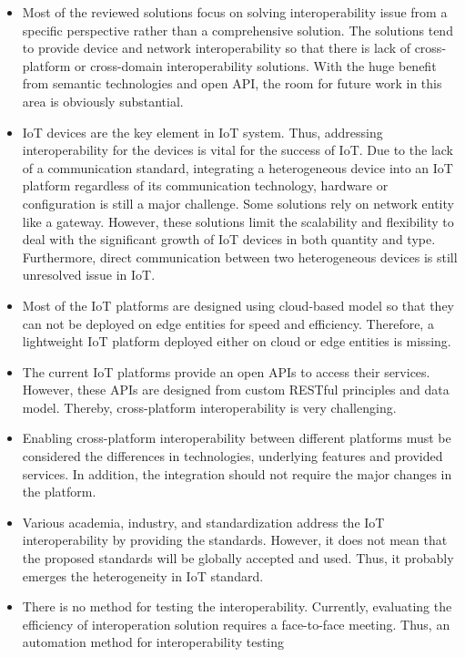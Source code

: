 \begin{itemize}

    \item Most of the reviewed solutions focus on solving interoperability issue from a specific perspective rather than a comprehensive solution. The solutions tend to provide device and network interoperability so that there is lack of cross-platform or cross-domain interoperability solutions. With the huge benefit from semantic technologies and open API, the room for future work in this area is obviously substantial.
    
    \item IoT devices are the key element in IoT system. Thus, addressing interoperability for the devices is vital for the success of IoT. Due to the lack of a communication standard, integrating a heterogeneous device into an IoT platform regardless of its communication technology, hardware or configuration is still a major challenge. Some solutions rely on network entity like a gateway. However, these solutions limit the scalability and flexibility to deal with the significant growth of IoT devices in both quantity and type. Furthermore, direct communication between two heterogeneous devices is still unresolved issue in IoT.
    
    \item Most of the IoT platforms are designed using cloud-based model so that they can not be deployed on edge entities for speed and efficiency. Therefore, a lightweight IoT platform deployed either on cloud or edge entities is missing. 
    
    \item The current IoT platforms provide an open APIs to access their services. However, these APIs are designed from custom RESTful principles and data model. Thereby, cross-platform interoperability is very challenging. 
    
    \item Enabling cross-platform interoperability between different platforms must be considered the differences in technologies, underlying features and provided services. In addition, the integration should not require the major changes in the platform. 
    
    \item Various academia, industry, and standardization address the IoT interoperability by providing the standards. However, it does not mean that the proposed standards will be globally accepted and used. Thus, it probably emerges the heterogeneity in IoT standard. 
    
    \item There is no method for testing the interoperability. Currently, evaluating the efficiency of interoperation solution requires a face-to-face meeting. Thus, an automation method for interoperability testing
    
\end{itemize}

